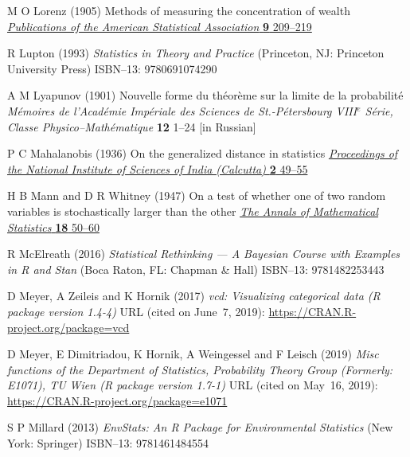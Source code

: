 \begin{thebibliography}{99}
M O Lorenz
(1905) Methods of measuring the concentration of wealth
\href{http://dx.doi.org/10.2307/2276207}{\textit{Publications of
the American Statistical Association} \textbf{9} 209--219}

R Lupton
(1993) \textit{Statistics in Theory and Practice}
(Princeton, NJ: Princeton University Press)
ISBN--13: 9780691074290

A M Lyapunov
(1901) Nouvelle forme du th\'{e}or\`{e}me sur la limite de la 
probabilit\'{e}
\textit{M\'{e}moires de l'Acad\'{e}mie Imp\'{e}riale des Sciences de 
St.-P\'{e}tersbourg VIII$^{e}$ S\'{e}rie, Classe 
Physico--Math\'{e}matique} \textbf{12} 1--24 [in Russian]

P C Mahalanobis
(1936) On the generalized distance in statistics
\href{http://www.new.dli.ernet.in/rawdataupload/upload/insa/INSA_1/20006193_49.pdf}{\textit{Proceedings of the National Institute of 
Sciences of India (Calcutta)} \textbf{2} 49--55}

H B Mann and D R Whitney
(1947) On a test of whether one of two random variables
is stochastically larger than the other
\href{http://projecteuclid.org/euclid.aoms/1177730491}{\textit{The 
Annals of Mathematical Statistics} \textbf{18} 50--60}

R McElreath
(2016) \textit{Statistical Rethinking --- A Bayesian Course with 
Examples in R and Stan}
(Boca Raton, FL: Chapman \& Hall) ISBN--13: 9781482253443

D Meyer, A Zeileis and K Hornik
(2017) \textit{vcd: Visualizing categorical data
(R package version 1.4-4)}
URL (cited on June~7, 2019): 
\href{https://CRAN.R-project.org/package=vcd}{https://CRAN.R-project.org/package=vcd}

D Meyer, E Dimitriadou, K Hornik, A Weingessel and F Leisch
(2019) \textit{Misc functions of the Department of Statistics,
Probability Theory Group (Formerly: E1071), TU Wien
(R package version 1.7-1)}
URL (cited on May~16, 2019):
\href{https://CRAN.R-project.org/package=e1071}{https://CRAN.R-project.org/package=e1071}

S P Millard
(2013) \textit{EnvStats: An R Package for Environmental Statistics}
(New York: Springer)
ISBN--13: 9781461484554


\end{thebibliography}
